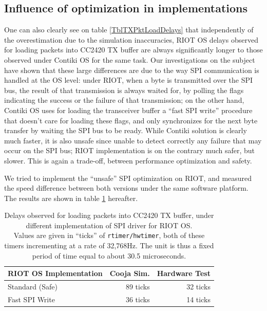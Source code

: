 \documentclass[conference]{IEEEtran}
\begin{document}
\subsection{Influence of optimization in implementations}

One can also clearly see on table \ref{TblTXPktLoadDelays} that independently
of the overestimation due to the simulation inaccuracies, RIOT OS delays
observed for loading packets into CC2420 TX buffer are always significantly
longer to those observed under Contiki OS for the same task.
Our investigations on the subject have shown that these large differences
are due to the way SPI communication is handled at the OS level: under RIOT,
when a byte is transmitted over the SPI bus, the result of that transmission
is always waited for, by polling the flags indicating the success or the
failure of that transmission; on the other hand, Contiki OS uses for loading
the transceiver buffer a ``fast SPI write'' procedure that doesn't care for
loading these flags, and only synchronizes for the next byte transfer by
waiting the SPI bus to be ready. While Contiki solution is clearly much
faster, it is also unsafe since unable to detect correctly any failure
that may occur on the SPI bus; RIOT implementation is on the contrary
much safer, but slower. This is again a trade-off, between performance
optimization and safety.

We tried to implement the ``unsafe'' SPI optimization on RIOT, and measured
the speed difference between both versions under the same software platform.
The results are shown in table \ref{TblRIOTLoadDelays} hereafter.

\begin{table}[!h]
\centering
\begin{tabular}{|l|r|r|}
\hline
RIOT OS Implementation &  Cooja Sim.  & Hardware Test \\
\hline
Standard (Safe)        &   89 ticks   &  32 ticks \\ 
Fast SPI Write         &   36 ticks   &  14 ticks \\
\hline
\end{tabular}
\caption{Delays observed for loading packets into CC2420 TX buffer, under
different implementation of SPI driver for RIOT OS.\\
Values are given in ``ticks'' of \texttt{rtimer/hwtimer}, both of these
timers incrementing at a rate of 32,768Hz. The unit is thus a fixed period
of time equal to about 30.5 microseconds.}
\label{TblRIOTLoadDelays}
\end{table}
\end{document}
